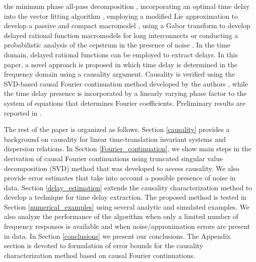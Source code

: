 \documentclass[journal,twoside]{IEEEtran}
\begin{document}
 the minimum phase all-pass decomposition \cite{Mandrekar_Swaminathan_2005, Mandrekar_Srinivasan_Engin_Swminathan_2007, Lalgudi_Engin_Casinovi_Swaminathan_2008}, 
  incorporating an optimal time delay into the vector fitting algorithm  \cite{Gustavsen_2004, De_Tommasi_Gustavsen_2006}, 
 employing a modified Lie approximation to develop a passive and compact macromodel \cite{Nakhla_Dounavis_Achar_Nakhla_2005},
using a Gabor transform to develop delayed rational function macromodels for long interconnects \cite{Grivet_Talocia_2006, Chinea_Triverio_Grivet_Talocia_2010} or conducting a probabilistic analysis of the cepstrum in the presence of noise \cite{Hassab_Boucher_1976}. In the time domain, delayed rational functions \cite{Charest_Saraswat_Nakhla_Achar_Soveiko_2007, Charest_Nakhla_Achar_Saraswat_Soveiko_Erdin_2010} can be employed to extract delays. In this paper, a novel approach is proposed in which time delay is determined in the frequency domain using a causality argument. Causality is verified using the SVD-based causal Fourier continuation method developed by the authors \cite{Barannyk_Aboutaleb_Elshabini_Barlow_IEEE, Barannyk_Aboutaleb_Elshabini_Barlow_IMAPS2014}, while the time delay presence is incorporated by a linearly varying phase factor to the system of equations that determines Fourier coefficients.  Preliminary results are reported in \cite{Barannyk_Tran_Nguyen_Elshabini_Barlow_EPEPS2015}.

The rest of the paper is organized as follows. Section \ref{causality} provides a  background on causality for linear time-translation invariant systems and dispersion relations. In Section \ref{Fourier_continuation}, we show main steps in the derivation of causal  Fourier continuations using truncated singular value decomposition (SVD) method that was developed to access causality.  We also provide error estimates that take into account a possible presence of noise in data. Section \ref{delay_estimation} extends the causality characterization method to develop a technique for time delay extraction. The proposed method is tested in Section \ref{numerical_examples} using several analytic and simulated examples. We also analyze the performance of the algorithm when only a limited number of frequency  responses is available and when noise/approximation errors are present in data.
In Section \ref{conclusions} we present our conclusions. The Appendix section is devoted to formulation of error bounds for the causality characterization method based on causal Fourier continuations.
\end{document}
